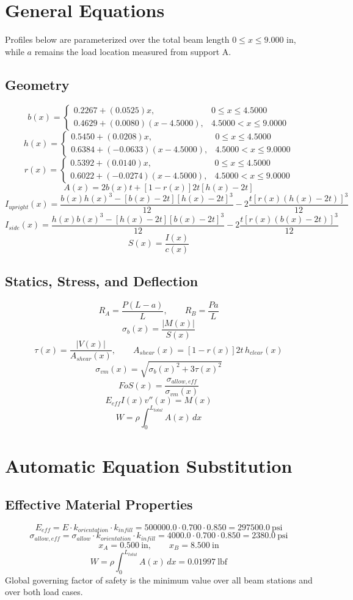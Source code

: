 \documentclass[11pt]{article}
\begin{document}
\section*{General Equations}
Profiles below are parameterized over the total beam length $0 \le x \le 9.000$ in, while $a$ remains the load location measured from support A.
\subsection*{Geometry}
\[
b(x)=\begin{cases}0.2267 + (0.0525)x, & 0 \le x \le 4.5000\\0.4629 + (0.0080)(x-4.5000), & 4.5000 < x \le 9.0000\end{cases}
\]
\[
h(x)=\begin{cases}0.5450 + (0.0208)x, & 0 \le x \le 4.5000\\0.6384 + (-0.0633)(x-4.5000), & 4.5000 < x \le 9.0000\end{cases}
\]
\[
r(x)=\begin{cases}0.5392 + (0.0140)x, & 0 \le x \le 4.5000\\0.6022 + (-0.0274)(x-4.5000), & 4.5000 < x \le 9.0000\end{cases}
\]
\[
A(x)=2b(x)t+[1-r(x)]2t[h(x)-2t]
\]
\[
I_{upright}(x)=\frac{b(x)h(x)^3-[b(x)-2t][h(x)-2t]^3}{12}-2\frac{t[r(x)(h(x)-2t)]^3}{12}
\]
\[
I_{side}(x)=\frac{h(x)b(x)^3-[h(x)-2t][b(x)-2t]^3}{12}-2\frac{t[r(x)(b(x)-2t)]^3}{12}
\]
\[
S(x)=\frac{I(x)}{c(x)}
\]

\subsection*{Statics, Stress, and Deflection}
\[
R_A=\frac{P(L-a)}{L}, \qquad R_B=\frac{Pa}{L}
\]
\[
\sigma_b(x)=\frac{|M(x)|}{S(x)}
\]
\[
\tau(x)=\frac{|V(x)|}{A_{shear}(x)}, \qquad A_{shear}(x)=[1-r(x)]2t\,h_{clear}(x)
\]
\[
\sigma_{vm}(x)=\sqrt{\sigma_b(x)^2+3\tau(x)^2}
\]
\[
FoS(x)=\frac{\sigma_{allow,eff}}{\sigma_{vm}(x)}
\]
\[
E_{eff}I(x)v''(x)=M(x)
\]
\[
W=\rho\int_0^{L_{total}} A(x)\,dx
\]

\section*{Automatic Equation Substitution}
\subsection*{Effective Material Properties}
\[E_{eff} = E \cdot k_{orientation} \cdot k_{infill} = 500000.0 \cdot 0.700 \cdot 0.850 = 297500.0\ \mathrm{psi}\]
\[\sigma_{allow,eff} = \sigma_{allow} \cdot k_{orientation} \cdot k_{infill} = 4000.0 \cdot 0.700 \cdot 0.850 = 2380.0\ \mathrm{psi}\]
\[x_A = 0.500\ \mathrm{in}, \qquad x_B = 8.500\ \mathrm{in}\]
\[W = \rho \int_0^{L_{total}} A(x)\,dx = 0.01997\ \mathrm{lbf}\]
Global governing factor of safety is the minimum value over all beam stations and over both load cases.
\end{document}
